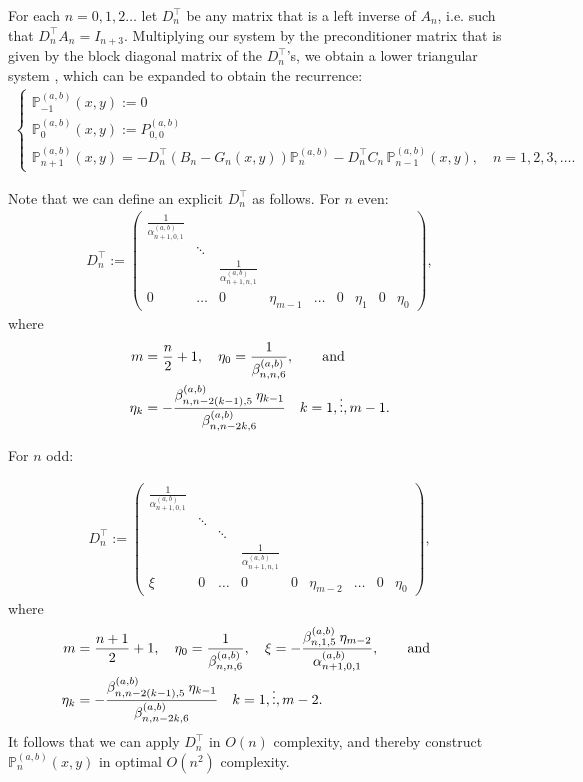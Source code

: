 \documentclass[11pt, oneside]{article}   	%
\newcommand{\bigP}{\mathbb{P}}
\newcommand{\alphaab}{\alpha^{(a,b)}}
\newcommand{\betaab}{\beta^{(a,b)}}
\newcommand{\bigPab}{\bigP^{(a,b)}}
\newcommand{\Dnt}{D^\top_n}
\begin{document}
For each $n = 0,1,2\dots$ let $\Dnt$ be any matrix that is a left inverse of $A_n$, i.e. such that $\Dnt A_n = I_{n+3}$. Multiplying our system by the preconditioner matrix that is given by the block diagonal matrix of the $\Dnt$'s, we obtain a lower triangular system \cite[p78]{dunkl2014orthogonal}, which can be expanded to obtain the recurrence:
\begin{align}
\begin{cases}
\bigPab_{-1}(x,y) := 0 \\
\bigPab_{0}(x,y) := P^{(a,b)}_{0,0} \\
\bigPab_{n+1}(x,y) = -\Dnt (B_n-G_n(x,y)) \bigPab_n - \Dnt C_n  \,\bigPab_{n-1}(x,y), \quad n = 1,2,3,\dots.
\end{cases}
\end{align}

Note that we can define an explicit \(\Dnt\) as follows. For \(n\) even:
\begin{align}
\Dnt := \begin{pmatrix}
		\frac{1}{\alphaab_{n+1,0,1}} & & &  \\
		& \ddots & & & \\
		& & \frac{1}{\alphaab_{n+1,n,1}} & \\
		0 & \hdots & 0 & \eta_{m-1} & \hdots & 0 & \eta_1 & 0 & \eta_0
	    \end{pmatrix},
\end{align}
where
\begin{align}
m &= \frac{n}{2} + 1, \quad \eta_0 = \frac{1}{\betaab_{n,n,6}},\qqand \nonumber \\
\eta_k &= -\frac{\betaab_{n,n-2(k-1),5} \: \eta_{k-1}}{\betaab_{n,n-2k,6}} \quad k = 1,\dots,m-1.
\end{align}

For \(n\) odd:

\begin{align}
\Dnt := \begin{pmatrix}
		\frac{1}{\alphaab_{n+1,0,1}} & &  \\
		& \ddots & & &  \\
		& & \ddots & & \\
		& & & \frac{1}{\alphaab_{n+1,n,1}} & \\
		\xi & 0 & \hdots & 0 & 0 & \eta_{m-2} & \hdots & 0 & \eta_0
	    \end{pmatrix},
\end{align}
 where
\begin{align}
m &= \frac{n+1}{2} + 1,\quad  \eta_0 = \frac{1}{\betaab_{n,n,6}}, \quad \xi = -\frac{\betaab_{n,1,5} \: \eta_{m-2}}{\alphaab_{n+1,0,1}},\qqand \nonumber \\
\eta_k &= -\frac{\betaab_{n,n-2(k-1),5} \: \eta_{k-1}}{\betaab_{n,n-2k,6}} \quad k = 1,\dots,m-2.
\end{align}
It follows that we can apply $\Dnt$ in $O(n)$ complexity, and thereby construct $\bigPab_{n}(x,y)$ in optimal $O(n^2)$ complexity.
\end{document}
